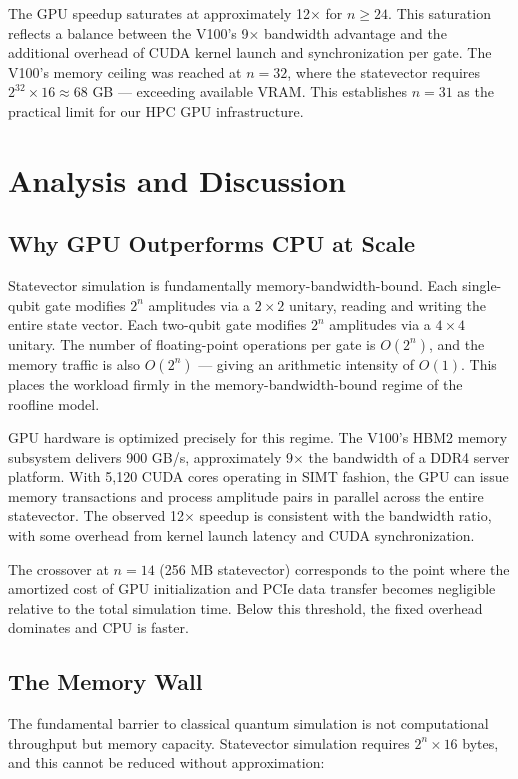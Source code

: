 \documentclass[sigconf, authorversion=true, nonacm=true]{acmart}
\begin{document}
The GPU speedup saturates at approximately 12$\times$ for $n \geq 24$. This saturation reflects a balance between the V100's 9$\times$ bandwidth advantage and the additional overhead of CUDA kernel launch and synchronization per gate. The V100's memory ceiling was reached at $n=32$, where the statevector requires $2^{32} \times 16 \approx 68$ GB — exceeding available VRAM. This establishes $n=31$ as the practical limit for our HPC GPU infrastructure.

\section{Analysis and Discussion}

\subsection{Why GPU Outperforms CPU at Scale}

Statevector simulation is fundamentally memory-bandwidth-bound. Each single-qubit gate modifies $2^n$ amplitudes via a $2 \times 2$ unitary, reading and writing the entire state vector. Each two-qubit gate modifies $2^n$ amplitudes via a $4 \times 4$ unitary. The number of floating-point operations per gate is $O(2^n)$, and the memory traffic is also $O(2^n)$ — giving an arithmetic intensity of $O(1)$. This places the workload firmly in the memory-bandwidth-bound regime of the roofline model.

GPU hardware is optimized precisely for this regime. The V100's HBM2 memory subsystem delivers 900 GB/s, approximately 9$\times$ the bandwidth of a DDR4 server platform. With 5,120 CUDA cores operating in SIMT fashion, the GPU can issue memory transactions and process amplitude pairs in parallel across the entire statevector. The observed 12$\times$ speedup is consistent with the bandwidth ratio, with some overhead from kernel launch latency and CUDA synchronization.

The crossover at $n=14$ (256 MB statevector) corresponds to the point where the amortized cost of GPU initialization and PCIe data transfer becomes negligible relative to the total simulation time. Below this threshold, the fixed overhead dominates and CPU is faster.

\subsection{The Memory Wall}

The fundamental barrier to classical quantum simulation is not computational throughput but memory capacity. Statevector simulation requires $2^n \times 16$ bytes, and this cannot be reduced without approximation:
\end{document}
